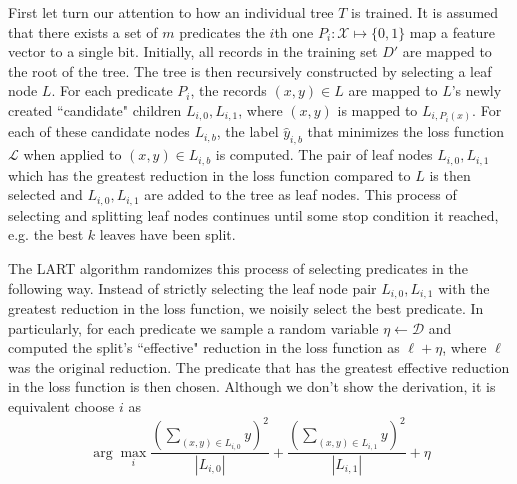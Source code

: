 \documentclass{article} %
\begin{document}
First let turn our attention to how an individual tree $T$ is trained. It is assumed that there exists a set of $m$ predicates the $i$th one $P_i:\mathcal{X} \mapsto \{0,1\}$ map a feature vector to a single bit.  Initially, all records in the training set $D'$ are mapped to the root of the tree. The tree is then recursively constructed by selecting a leaf node $L$. For each predicate $P_i$, the records $(x,y)\in L$ are mapped to $L$'s newly created ``candidate" children $L_{i,0},L_{i,1}$, where $(x,y)$ is mapped to $L_{i,P_i(x)}$. For each of these candidate nodes $L_{i,b}$, the label $\hat{y}_{i,b}$ that minimizes the loss function $\mathcal{L}$ when applied to $(x,y)\in L_{i,b}$ is computed. The pair of leaf nodes $L_{i,0}, L_{i,1}$ which has the greatest reduction in the loss function compared to $L$ is then selected and $L_{i,0}, L_{i,1}$ are added to the tree as leaf nodes. This process of selecting and splitting leaf nodes continues until some stop condition it reached, e.g. the best $k$ leaves have been split.

The LART algorithm randomizes this process of selecting predicates in the following way. Instead of strictly selecting the leaf node pair $L_{i,0}, L_{i,1}$ with the greatest reduction in the loss function, we noisily select the best predicate. In particularly, for each predicate we sample a random variable $\eta\gets \mathcal{D}$ and computed the split's ``effective" reduction in the loss function as $\ell + \eta$, where $\ell$ was the original reduction. The predicate that has the greatest effective reduction in the loss function is then chosen. Although we don't show the derivation, it is equivalent choose $i$ as   
$$
	\arg \max_i \frac{(\sum_{(x,y)\in L_{i,0}} y)^2}{|L_{i,0}|} + \frac{(\sum_{(x,y)\in L_{i,1}} y)^2}{|L_{i,1}|} + \eta
$$ 


%
%	
%	
%		
%		
%		
%		
%		
%		
%		
%		
%		
%		
%	
\end{document}
